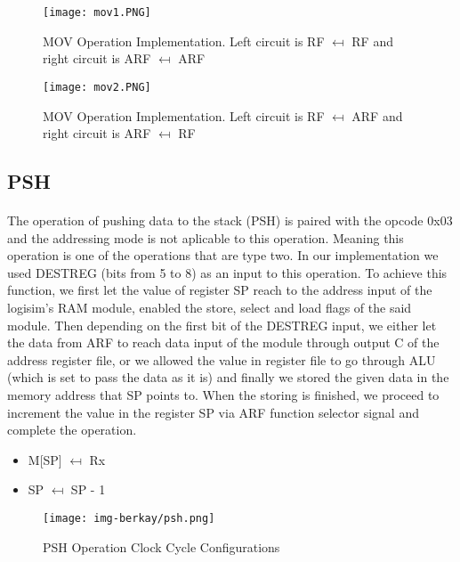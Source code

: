 \documentclass{article}
\begin{document}
\begin{figure}[h]
    \centering
    \texttt{[image: mov1.PNG]}
    \caption{MOV Operation Implementation. Left circuit is RF $\mapsfrom$ RF and right circuit is ARF $\mapsfrom$ ARF}
    \label{fig:my_label}
\end{figure}

\newpage

\begin{figure}[h]
    \centering
    \texttt{[image: mov2.PNG]}
    \caption{MOV Operation Implementation. Left circuit is RF $\mapsfrom$ ARF and right circuit is ARF $\mapsfrom$ RF}
    \label{fig:my_label}
\end{figure}
\newpage
\subsection{PSH}
\paragraph{}
The operation of pushing data to the stack (PSH) is paired with the opcode 0x03 and the addressing mode is not aplicable to this operation. Meaning this operation is one of the operations that are type two. In our implementation we used DESTREG (bits from 5 to 8) as an input to this operation. To achieve this function, we first let the value of register SP reach to the address input of the logisim's RAM module, enabled the store, select and load flags of the said module. Then depending on the first bit of the DESTREG input, we either let the data from ARF to reach data input of the module through output C of the address register file, or we allowed the value in register file to go through ALU (which is set to pass the data as it is) and finally we stored the given data in the memory address that SP points to. When the storing is finished, we proceed to increment the value in the register SP via ARF function selector signal and complete the operation.
\begin{itemize}
    \item M[SP] $\mapsfrom$ Rx
    \item SP $\mapsfrom$ SP - 1
\end{itemize}

\begin{figure}[h]
    \centering
    \texttt{[image: img-berkay/psh.png]}
    \caption{PSH Operation Clock Cycle Configurations}
    \label{fig:my_label}
\end{figure}
\end{document}
